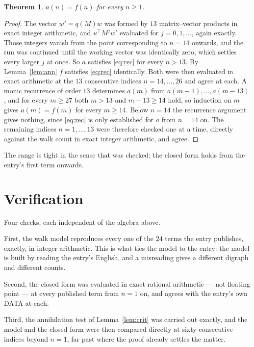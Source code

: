 \documentclass[11pt,a4paper]{article}
\theoremstyle{plain}
\newtheorem{theorem}{Theorem}
\theoremstyle{definition}
\begin{document}
\begin{theorem}
$a(n)=f(n)$ for every $n\ge1$.
\end{theorem}

\begin{proof}
The vector $w'=q(M)w$ was formed by $13$ matrix--vector products in exact integer
arithmetic, and $u^{\!\top}M^{j}w'$ evaluated for $j=0,1,\dots$, again exactly. Those integers
vanish from the point corresponding to $n=14$ onwards, and the run was continued until the
working vector was identically zero, which settles every larger $j$ at once. So $a$ satisfies
\eqref{eq:rec} for every $n>13$. By Lemma~\ref{lem:ann} $f$ satisfies \eqref{eq:rec}
identically. Both were then evaluated in exact arithmetic at the $13$ consecutive indices
$n=14,\dots,26$ and agree at each. A monic recurrence of order $13$
determines $a(m)$ from $a(m-1),\dots,a(m-13)$, and for every $m\ge27$ both
$m>13$ and $m-13\ge14$ hold, so induction on $m$ gives $a(m)=f(m)$ for every
$m\ge14$.
Below $n=14$ the recurrence argument gives nothing, since \eqref{eq:rec} is only
established for $a$ from $n=14$ on. The remaining indices $n=1,\dots,13$ were
therefore checked one at a time, directly against the walk count in exact integer arithmetic,
and agree.
\end{proof}

The range is tight in the sense that was checked: the closed form holds from the entry's first term onwards.

\section{Verification}

Four checks, each independent of the algebra above.

First, the walk model reproduces every one of the $24$ terms the entry publishes,
exactly, in integer arithmetic. This is what ties the model to the entry: the model is built
by reading the entry's English, and a misreading gives a different digraph and different
counts.

Second, the closed form was evaluated in exact rational arithmetic --- not floating point ---
at every published term from $n=1$ on, and agrees with the entry's own DATA at each.

Third, the annihilation test of Lemma~\ref{lem:crit} was carried out exactly, and the model
and the closed form were then compared directly at sixty consecutive indices beyond
$n=1$, far past where the proof already settles the matter.
\end{document}
